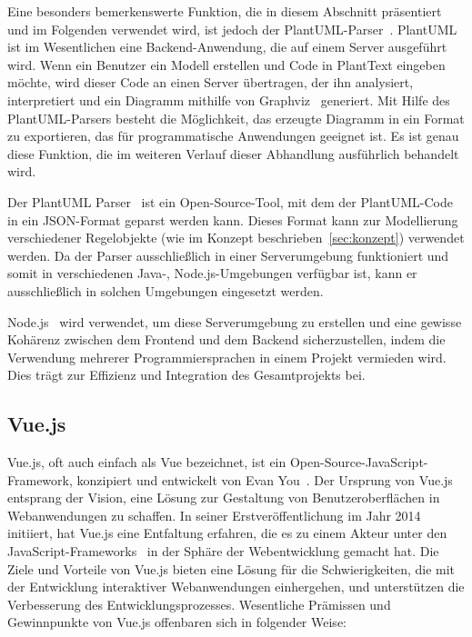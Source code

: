 Eine besonders bemerkenswerte Funktion, die in diesem Abschnitt präsentiert und im Folgenden verwendet wird, ist jedoch
der PlantUML-Parser~\cite{plantUMLParser}. PlantUML ist im Wesentlichen eine Backend-Anwendung, die auf einem Server
ausgeführt wird. Wenn ein Benutzer ein Modell erstellen und Code in PlantText eingeben möchte, wird dieser Code an einen Server
übertragen, der ihn analysiert, interpretiert und ein Diagramm mithilfe von Graphviz~\cite{graphViz} generiert. Mit
Hilfe des PlantUML-Parsers besteht die Möglichkeit, das erzeugte Diagramm in ein Format zu exportieren, das für
programmatische Anwendungen geeignet ist. Es ist genau diese Funktion, die im weiteren Verlauf dieser Abhandlung
ausführlich behandelt wird.

Der PlantUML Parser~\cite{plantUMLParser} ist ein Open-Source-Tool,
mit dem der PlantUML-Code in ein JSON-Format geparst werden kann. Dieses Format kann zur Modellierung verschiedener
Regelobjekte (wie im Konzept beschrieben~\ref{sec:konzept}) verwendet werden. Da der Parser ausschließlich in einer
Serverumgebung funktioniert und somit in verschiedenen Java-, Node.js-Umgebungen verfügbar ist, kann er
ausschließlich in solchen Umgebungen eingesetzt werden.

Node.js~\cite{Node} wird verwendet, um diese Serverumgebung zu erstellen und eine gewisse Kohärenz zwischen dem
Frontend und dem Backend sicherzustellen, indem die Verwendung mehrerer Programmiersprachen in einem Projekt vermieden
wird. Dies trägt zur Effizienz und Integration des Gesamtprojekts bei.

\subsection{Vue.js}

Vue.js, oft auch einfach als Vue bezeichnet, ist ein  Open-Source-JavaScript-Framework, konzipiert und
entwickelt von Evan You~\cite{vue}. Der Ursprung von Vue.js entsprang der Vision, eine Lösung zur Gestaltung von
Benutzeroberflächen in Webanwendungen zu schaffen. In seiner Erstveröffentlichung im Jahr 2014 initiiert, hat Vue.js
eine Entfaltung erfahren, die es zu einem Akteur unter den JavaScript-Frameworks~\cite{levlin2020dom} in der
Sphäre der Webentwicklung gemacht hat. Die Ziele und Vorteile von Vue.js bieten eine Lösung für die Schwierigkeiten, die
mit der Entwicklung interaktiver Webanwendungen einhergehen, und unterstützen die Verbesserung des Entwicklungsprozesses.
Wesentliche Prämissen und Gewinnpunkte von Vue.js offenbaren sich in folgender Weise:

